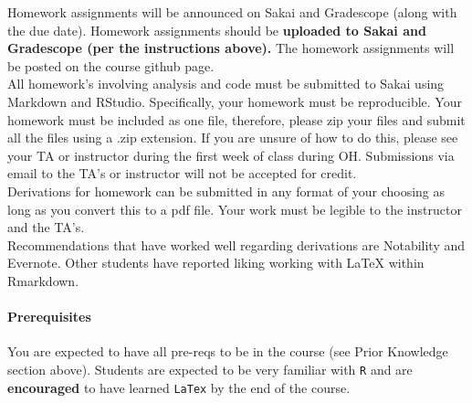\documentclass[11pt]{article}
\begin{document}
Homework assignments will be announced on Sakai and Gradescope (along with the due date). Homework assignments should be \textbf{uploaded to Sakai and Gradescope (per the instructions above).} The homework assignments will be posted on the course github page. \\

All homework's involving analysis and code must be submitted to Sakai using Markdown and RStudio. Specifically, your homework must be reproducible. Your homework must be included as one file, therefore, please zip your files and submit all the files using a .zip extension. If you are unsure of how to do this, please see your TA or instructor during the first week of class during OH. Submissions via email to the TA's or instructor will not be accepted for credit. \\

Derivations for homework can be submitted in any format of your choosing as long as you convert this to a pdf file. Your work must be legible to the instructor and the TA's. \\

Recommendations that have worked well regarding derivations are Notability and Evernote. Other students have reported liking working with LaTeX within Rmarkdown. \\


\paragraph{Prerequisites}

You are expected to have all pre-reqs to be in the course (see Prior Knowledge section above). Students are expected to be very familiar with \texttt{R} and are \textbf{encouraged} to have learned \texttt{LaTex} by the end of the course. 
\end{document}
